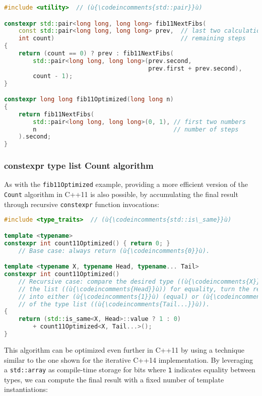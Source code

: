 \begin{lstlisting}[language=C++]
#include <utility>  // (ù{\codeincomments{std::pair}}ù)

constexpr std::pair<long long, long long> fib11NextFibs(
    const std::pair<long long, long long> prev,  // last two calculations
    int count)                                   // remaining steps
{
    return (count == 0) ? prev : fib11NextFibs(
        std::pair<long long, long long>(prev.second,
                                        prev.first + prev.second),
        count - 1);
}

constexpr long long fib11Optimized(long long n)
{
    return fib11NextFibs(
        std::pair<long long, long long>(0, 1), // first two numbers
        n                                      // number of steps
    ).second;
}
\end{lstlisting}


\subsubsection[{\ttfamily constexpr} type list {\ttfamily Count} algorithm]{{\SubsubsecCode constexpr} type list {\SubsubsecCode Count} algorithm}\label{constexpr-typelist-count-algorithm}

As with the \texttt{fib11Optimized} example, providing a more efficient version of the \texttt{Count} algorithm in
C++11 is also possible, by accumulating the final result through recursive
\texttt{constexpr} function invocations:

\begin{lstlisting}[language=C++]
#include <type_traits>  // (ù{\codeincomments{std::is\_same}}ù)

template <typename>
constexpr int count11Optimized() { return 0; }
    // Base case: always return (ù{\codeincomments{0}}ù).

template <typename X, typename Head, typename... Tail>
constexpr int count11Optimized()
    // Recursive case: compare the desired type ((ù{\codeincomments{X}}ù)) and the first type in
    // the list ((ù{\codeincomments{Head}}ù)) for equality, turn the result of the comparison
    // into either (ù{\codeincomments{1}}ù) (equal) or (ù{\codeincomments{0}}ù) (not equal), and recurse with the rest
    // of the type list ((ù{\codeincomments{Tail...}}ù)).
{
    return (std::is_same<X, Head>::value ? 1 : 0)
        + count11Optimized<X, Tail...>();
}
\end{lstlisting}

\noindent This algorithm can be optimized even further in C++11 by using
a technique similar to the one shown for the iterative C++14
implementation. By leveraging a \texttt{std::array} as compile-time
storage for bits where \texttt{1} indicates equality between types, we can compute the final result with a fixed number of template
instantiations:

